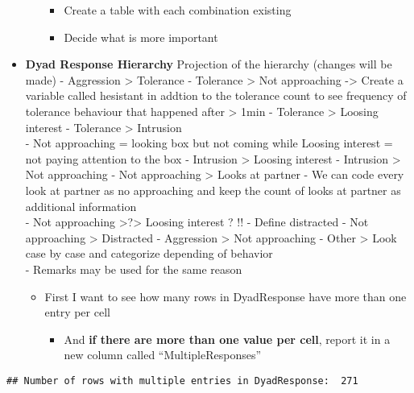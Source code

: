 \documentclass[
]{article}
\providecommand{\tightlist}{%
  \setlength{\itemsep}{0pt}\setlength{\parskip}{0pt}}
\begin{document}
\begin{itemize}
\begin{itemize}
    \begin{itemize}
    \item
      Create a table with each combination existing
    \item
      Decide what is more important
    \end{itemize}
  \end{itemize}
\item
  \textbf{Dyad Response Hierarchy} Projection of the hierarchy (changes
  will be made) - Aggression \textgreater{} Tolerance - Tolerance
  \textgreater{} Not approaching -\textgreater{} Create a variable
  called hesistant in addtion to the tolerance count to see frequency of
  tolerance behaviour that happened after \textgreater{} 1min -
  Tolerance \textgreater{} Loosing interest - Tolerance \textgreater{}
  Intrusion\\
  - Not approaching = looking box but not coming while Loosing interest
  = not paying attention to the box - Intrusion \textgreater{} Loosing
  interest - Intrusion \textgreater{} Not approaching - Not approaching
  \textgreater{} Looks at partner - We can code every look at partner as
  no approaching and keep the count of looks at partner as additional
  information\\
  - Not approaching \textgreater?\textgreater{} Loosing interest ? !! -
  Define distracted - Not approaching \textgreater{} Distracted -
  Aggression \textgreater{} Not approaching - Other \textgreater{} Look
  case by case and categorize depending of behavior\\
  - Remarks may be used for the same reason

  \begin{itemize}
  \item
    First I want to see how many rows in DyadResponse have more than one
    entry per cell

    \begin{itemize}
    \tightlist
    \item
      And \textbf{if there are more than one value per cell}, report it
      in a new column called ``MultipleResponses''
    \end{itemize}
  \end{itemize}
\end{itemize}

\begin{verbatim}
## Number of rows with multiple entries in DyadResponse:  271
\end{verbatim}
\end{document}
